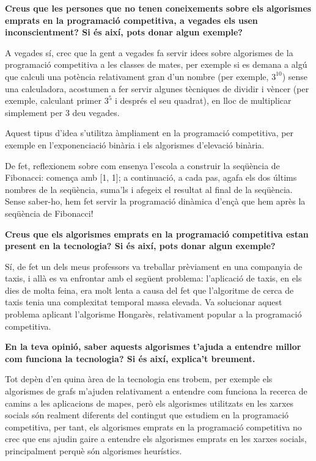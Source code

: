 \textbf{Creus que les persones que no tenen coneixements sobre els algorismes emprats en la programació competitiva, a vegades els usen inconscientment? Si és així, pots donar algun exemple?}
\newline

A vegades sí, crec que la gent a vegades fa servir idees sobre algorismes de la programació competitiva a les classes de mates, per exemple si es demana a algú que calculi una potència relativament gran d'un nombre (per exemple, $3^10$) sense una calculadora, acostumen a fer servir algunes tècniques de dividir i vèncer (per exemple, calculant primer $3^5$ i després el seu quadrat), en lloc de multiplicar simplement per 3 deu vegades.

Aquest tipus d'idea s'utilitza àmpliament en la programació competitiva, per exemple en l'exponenciació binària i els algorismes d'elevació binària.

De fet, reflexionem sobre com ensenya l'escola a construir la seqüència de Fibonacci: comença amb [1, 1]; a continuació, a cada pas, agafa els dos últims nombres de la seqüència, suma'ls i afegeix el resultat al final de la seqüència. Sense saber-ho, hem fet servir la programació dinàmica d'ençà que hem après la seqüència de Fibonacci!
\newline

\textbf{Creus que els algorismes emprats en la programació competitiva estan present en la tecnologia? Si és així, pots donar algun exemple?}
\newline

Sí, de fet un dels meus professors va treballar prèviament en una companyia de taxis, i allà es va enfrontar amb el següent problema: l'aplicació de taxis, en els dies de molta feina, era molt lenta a causa del fet que l'algoritme de cerca de taxis tenia una complexitat temporal massa elevada. Va solucionar aquest problema aplicant l'algorisme Hongarès, relativament popular a la programació competitiva.
\newline

\textbf{En la teva opinió, saber aquests algorismes t'ajuda a entendre millor com funciona la tecnologia? Si és així, explica't breument.}
\newline

Tot depèn d'en quina àrea de la tecnologia ens trobem, per exemple els algorismes de grafs m'ajuden relativament a entendre com funciona la recerca de camins a les aplicacions de mapes, però els algorismes utilitzats en les xarxes socials són realment diferents del contingut que estudiem en la programació competitiva, per tant, els algorismes emprats en la programació competitiva no crec que ens ajudin gaire a entendre els algorismes emprats en les xarxes socials, principalment perquè són algorismes heurístics.

